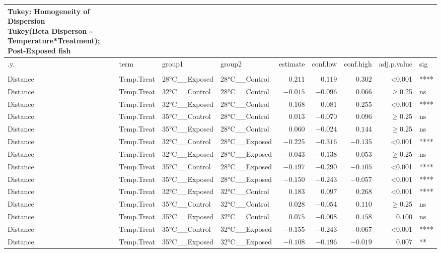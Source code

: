 \documentclass[
]{article}
\begin{document}
\begin{longtable}{llllrrrrl}
\caption*{
{\large Tukey: Homogeneity of Dispersion} \\ 
{\small Tukey(Beta Disperson \textasciitilde{} Temperature*Treatment); Post-Exposed fish}
} \\ 
\toprule
.y. & term & group1 & group2 & estimate & conf.low & conf.high & adj.p.value & sig \\ 
\midrule\addlinespace[2.5pt]
\multicolumn{9}{l}{bray} \\ 
\midrule\addlinespace[2.5pt]
Distance & Temp.Treat & 28°C\_\_Exposed & 28°C\_\_Control & $0.211$ & $0.119$ & $0.302$ & <0.001 & **** \\ 
Distance & Temp.Treat & 32°C\_\_Control & 28°C\_\_Control & $-0.015$ & $-0.096$ & $0.066$ & $\geq$0.25 & ns \\ 
Distance & Temp.Treat & 32°C\_\_Exposed & 28°C\_\_Control & $0.168$ & $0.081$ & $0.255$ & <0.001 & **** \\ 
Distance & Temp.Treat & 35°C\_\_Control & 28°C\_\_Control & $0.013$ & $-0.070$ & $0.096$ & $\geq$0.25 & ns \\ 
Distance & Temp.Treat & 35°C\_\_Exposed & 28°C\_\_Control & $0.060$ & $-0.024$ & $0.144$ & $\geq$0.25 & ns \\ 
Distance & Temp.Treat & 32°C\_\_Control & 28°C\_\_Exposed & $-0.225$ & $-0.316$ & $-0.135$ & <0.001 & **** \\ 
Distance & Temp.Treat & 32°C\_\_Exposed & 28°C\_\_Exposed & $-0.043$ & $-0.138$ & $0.053$ & $\geq$0.25 & ns \\ 
Distance & Temp.Treat & 35°C\_\_Control & 28°C\_\_Exposed & $-0.197$ & $-0.290$ & $-0.105$ & <0.001 & **** \\ 
Distance & Temp.Treat & 35°C\_\_Exposed & 28°C\_\_Exposed & $-0.150$ & $-0.243$ & $-0.057$ & <0.001 & **** \\ 
Distance & Temp.Treat & 32°C\_\_Exposed & 32°C\_\_Control & $0.183$ & $0.097$ & $0.268$ & <0.001 & **** \\ 
Distance & Temp.Treat & 35°C\_\_Control & 32°C\_\_Control & $0.028$ & $-0.054$ & $0.110$ & $\geq$0.25 & ns \\ 
Distance & Temp.Treat & 35°C\_\_Exposed & 32°C\_\_Control & $0.075$ & $-0.008$ & $0.158$ & $0.100$ & ns \\ 
Distance & Temp.Treat & 35°C\_\_Control & 32°C\_\_Exposed & $-0.155$ & $-0.243$ & $-0.067$ & <0.001 & **** \\ 
Distance & Temp.Treat & 35°C\_\_Exposed & 32°C\_\_Exposed & $-0.108$ & $-0.196$ & $-0.019$ & $0.007$ & ** \\ 

\end{longtable}
\end{document}
